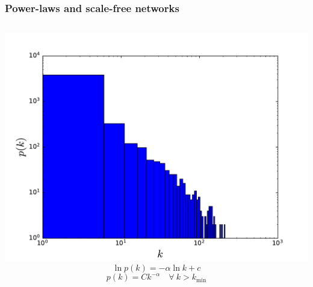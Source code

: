 \documentclass{beamer}
\begin{document}
\begin{frame}
    \frametitle{Power-laws and scale-free networks}
    \begin{columns}
        \centering
        \includegraphics[width=\columnwidth]{deg_distri_global_airport_log.pdf}
        \centering
        $$\ln p(k) = -\alpha \ln k + c$$ 
        $$p(k) = Ck^{-\alpha}\quad\forall \ k > k_{\text{min}}$$

    \end{columns}
\end{frame}
\end{document}
